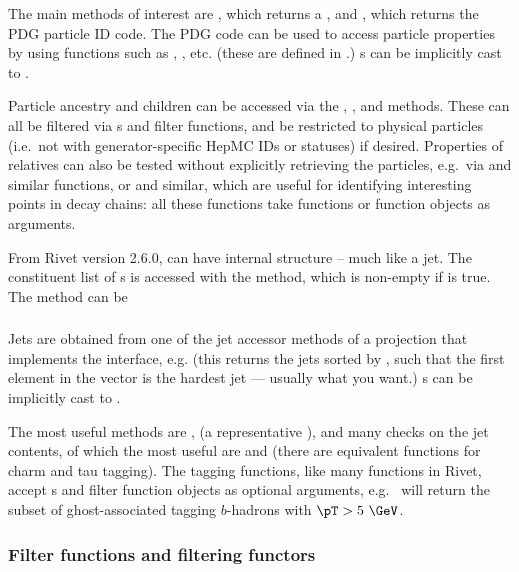 The main methods of interest are , which returns a
, and , which returns the PDG particle ID
code. The PDG code can be used to access particle properties by using functions
such as , , etc. (these are
defined in .)  s can be
implicitly cast to .

Particle ancestry and children can be accessed via the ,
,  and  methods. These
can all be filtered via s and filter functions, and be restricted to
physical particles (i.e.~not with generator-specific HepMC IDs or statuses) if
desired. Properties of relatives can also be tested without explicitly
retrieving the particles, e.g.~via  and similar
functions, or  and similar, which are useful for identifying
interesting points in decay chains: all these functions take functions or
function objects as arguments.

From Rivet version 2.6.0,  can have internal structure -- much
like a jet. The constituent list of s is accessed with the
 method, which is non-empty if
 is true. The  method can be

\subsubsection{}
Jets are obtained from one of the jet accessor methods of a projection that
implements the  interface, e.g.  (this
returns the jets sorted by \pT, such that the first element in the vector is the
hardest jet --- usually what you want.) s can be implicitly cast to
.

The most useful methods are ,  (a
representative ), and many checks on the jet contents, of
which the most useful are  and  (there are
equivalent functions for charm and tau tagging). The tagging functions, like
many functions in Rivet, accept s and filter function objects as
optional arguments, e.g.~ will return the subset
of ghost-associated tagging $b$-hadrons with $\pT > 5~\GeV$.

\subsubsection{Filter functions and filtering functors}

